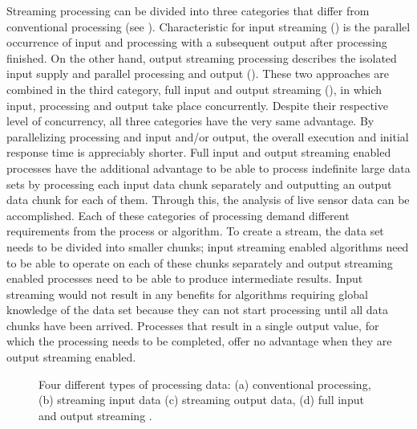 Streaming processing can be divided into three categories that differ from conventional processing (see ). Characteristic for input streaming () is the parallel occurrence of input and processing with a subsequent output after processing finished. On the other hand, output streaming processing describes the isolated input supply and parallel processing and output (). These two approaches are combined in the third category, full input and output streaming (), in which input, processing and output take place concurrently. Despite their respective level of concurrency, all three categories have the very same advantage. By parallelizing processing and input and/or output, the overall execution and initial response time is appreciably shorter. Full input and output streaming enabled processes have the additional advantage to be able to process indefinite large data sets by processing each input data chunk separately and outputting an output data chunk for each of them. Through this, the analysis of live sensor data can be accomplished. Each of these categories of processing demand different requirements from the process or algorithm. To create a stream, the data set needs to be divided into smaller chunks; input streaming enabled algorithms need to be able to operate on each of these chunks separately and output streaming enabled processes need to be able to produce intermediate results. Input streaming would not result in any benefits for algorithms requiring global knowledge of the data set because they can not start processing until all data chunks have been arrived. Processes that result in a single output value, for which the processing needs to be completed, offer no advantage when they are output streaming enabled.

\begin{figure}[!htb]
  \centering
  
  \caption[Four different types of processing data: (a) conventional processing, (b) streaming input data (c) streaming output data, (d) full input and output streaming.]{\label{fig:streaming}Four different types of processing data: (a) conventional processing, (b) streaming input data (c) streaming output data, (d) full input and output streaming \citep[based on][]{foerster2012live}.}
\end{figure}

